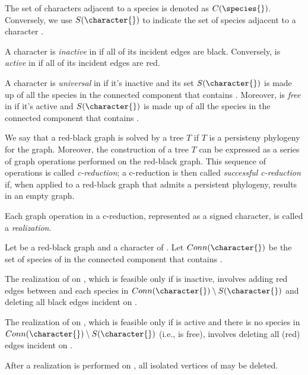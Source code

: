 The set of characters adjacent to a species \species{} is denoted as $C(\species{})$.
Conversely, we use $S(\character{})$ to indicate the set of species adjacent to a character \character{}.

A character \character{} is \emph{inactive} in \grb{} if all of its incident edges are black.
Conversely, \character{} is \emph{active} in \grb{} if all of its incident edges are red.

A character \character{} is \emph{universal} in \grb{} if it's inactive and its set $S(\character{})$ is made up of all the species in the connected component that contains \character{}.
Moreover, \character{} is \emph{free} in \grb{} if it's active and $S(\character{})$ is made up of all the species in the connected component that contains \character{}.

We say that a red-black graph \grb{} is solved by a tree $T$ if $T$ is a persisteny phylogeny for the graph.
Moreover, the construction of a tree $T$ can be expressed as a series of graph operations performed on the red-black graph.
This sequence of operations is called \emph{c-reduction}; a c-reduction is then called \emph{successful c-reduction} if, when applied to a red-black graph that admits a persistent phylogeny, results in an empty graph.

Each graph operation in a c-reduction, represented as a signed character, is called a \emph{realization}.

\begin{definition}[Realization]\label{definition:realization}
  Let \grb{} be a red-black graph and \character{} a character of \grb{}.
  Let $Conn(\character{})$ be the set of species of \grb{} in the connected component that contains \character{}.

  The realization of \character[][+] on \grb{}, which is feasible only if \character{} is inactive, involves adding red edges between \character{} and each species in $Conn(\character{}) \setminus S(\character{})$ and deleting all black edges incident on \character{}.

  The realization of \character[][-] on \grb{}, which is feasible only if \character{} is active and there is no species in $Conn(\character{}) \setminus S(\character{})$ (i.e., \character{} is free), involves deleting all (red) edges incident on \character{}.

  After a realization is performed on \grb{}, all isolated vertices of \grb{} may be deleted.
\end{definition}

